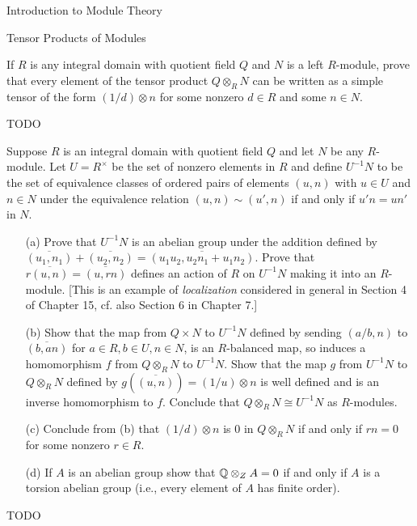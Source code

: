 \begin{chapter}{Introduction to Module Theory}
\begin{section}{Tensor Products of Modules}
\begin{problem}\label{ex:10.4.7}
If $R$ is any integral domain with quotient field $Q$ and $N$ is a left $R$-module, prove that every element of the tensor product $Q\otimes_R N$ can be written as a simple tensor of the form $(1/d)\otimes n$ for some nonzero $d\in R$ and some $n\in N$. 
\end{problem}
\begin{solution}TODO

\end{solution}\oneperpage



\begin{problem}\label{ex:10.4.8}
Suppose $R$ is an integral domain with quotient field $Q$ and let $N$ be any $R$-module. Let $U = R^\times$ be the set of nonzero elements in $R$ and define $U^{-1}N$ to be the set of equivalence classes of ordered pairs of elements $(u,n)$ with $u\in U$ and $n\in N$ under the equivalence relation $(u,n)\sim (u',n)$ if and only if $u'n = un'$ in $N$. 
\begin{enumerate}
\item[(a)] Prove that $U^{-1}N$ is an abelian group under the addition defined by $\overline{(u_1,n_1)} + \overline{(u_2,n_2)} = \overline{(u_1u_2,u_2n_1+u_1n_2)}$. Prove that $r\overline{(u,n)} = \overline{(u,rn)}$ defines an action of $R$ on $U^{-1}N$ making it into an $R$-module. [This is an example of \emph{localization} considered in general in Section 4 of Chapter 15, cf. also Section 6 in Chapter 7.]
\item[(b)]  Show that the map from $Q\times N$ to $U^{-1}N$ defined by sending $(a/b,n)$ to $\overline{(b,an)}$ for $a\in R, b\in U,n\in N$, is an $R$-balanced map, so induces a homomorphism $f$ from $Q\otimes_RN$ to $U^{-1}N$. Show that the map $g$ from $U^{-1}N$ to $Q\otimes_RN$ defined by $g(\overline{(u,n)}) = (1/u)\otimes n$ is well defined and is an inverse homomorphism to $f$. Conclude that $Q\otimes _R N \cong U^{-1}N$ as $R$-modules. 
\item[(c)] Conclude from (b) that $(1/d)\otimes n$ is 0 in $Q\otimes_R N$ if and only if $rn=0$ for some nonzero $r\in R$. 
\item[(d)] If $A$ is an abelian group show that $\mathbb{Q}\otimes_Z A = 0$ if and only if $A$ is a torsion abelian group (i.e., every element of $A$ has finite order). 
\end{enumerate}
\end{problem}
\begin{solution}TODO


\end{solution}
\end{section}
\end{chapter}
